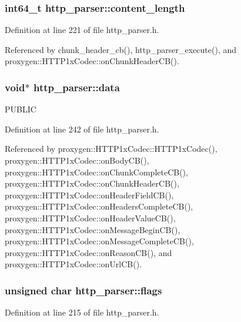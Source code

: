 \subsubsection[{content\+\_\+length}]{\setlength{\rightskip}{0pt plus 5cm}int64\+\_\+t http\+\_\+parser\+::content\+\_\+length}\label{structhttp__parser_a086c224e9226afbc619aa04aa2c9ace7}


Definition at line 221 of file http\+\_\+parser.\+h.



Referenced by chunk\+\_\+header\+\_\+cb(), http\+\_\+parser\+\_\+execute(), and proxygen\+::\+H\+T\+T\+P1x\+Codec\+::on\+Chunk\+Header\+C\+B().

\subsubsection[{data}]{\setlength{\rightskip}{0pt plus 5cm}void$\ast$ http\+\_\+parser\+::data}\label{structhttp__parser_a7e87ce57b97f60f1fdb7039a8ecb0bca}
P\+U\+B\+L\+IC 

Definition at line 242 of file http\+\_\+parser.\+h.



Referenced by proxygen\+::\+H\+T\+T\+P1x\+Codec\+::\+H\+T\+T\+P1x\+Codec(), proxygen\+::\+H\+T\+T\+P1x\+Codec\+::on\+Body\+C\+B(), proxygen\+::\+H\+T\+T\+P1x\+Codec\+::on\+Chunk\+Complete\+C\+B(), proxygen\+::\+H\+T\+T\+P1x\+Codec\+::on\+Chunk\+Header\+C\+B(), proxygen\+::\+H\+T\+T\+P1x\+Codec\+::on\+Header\+Field\+C\+B(), proxygen\+::\+H\+T\+T\+P1x\+Codec\+::on\+Headers\+Complete\+C\+B(), proxygen\+::\+H\+T\+T\+P1x\+Codec\+::on\+Header\+Value\+C\+B(), proxygen\+::\+H\+T\+T\+P1x\+Codec\+::on\+Message\+Begin\+C\+B(), proxygen\+::\+H\+T\+T\+P1x\+Codec\+::on\+Message\+Complete\+C\+B(), proxygen\+::\+H\+T\+T\+P1x\+Codec\+::on\+Reason\+C\+B(), and proxygen\+::\+H\+T\+T\+P1x\+Codec\+::on\+Url\+C\+B().

\subsubsection[{flags}]{\setlength{\rightskip}{0pt plus 5cm}unsigned char http\+\_\+parser\+::flags}\label{structhttp__parser_ad4f41ca1e40e3ee7de2fc74ad3f80dd5}


Definition at line 215 of file http\+\_\+parser.\+h.



